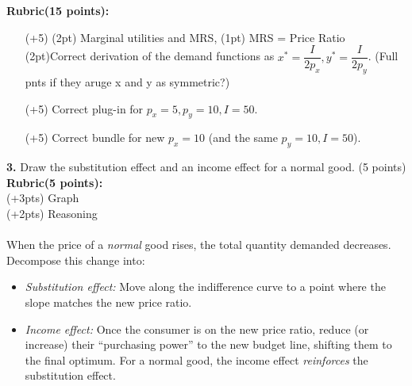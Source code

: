 \documentclass[12pt]{article}
\begin{document}
\vspace{1em}
\noindent
\textbf{Rubric(15 points):}
\begin{itemize}[noitemsep]
    \item[(+5)] (2pt) Marginal utilities and MRS, (1pt) MRS = Price Ratio (2pt)Correct derivation of the demand functions as $x^*=\dfrac{I}{2p_x}, y^*=\dfrac{I}{2p_y}$. (Full pnts if they aruge x and y as symmetric?) 
    \item[(+5)] Correct plug-in for $p_x=5, p_y=10, I=50$.
    \item[(+5)] Correct bundle for new $p_x=10$ (and the same $p_y=10, I=50$).
\end{itemize}

\noindent \textbf{3.} 
Draw the substitution effect and an income effect for a normal good. (5 points)\\
\textbf{Rubric(5 points):}\\
(+3pts) Graph\\
(+2pts) Reasoning\\\\
When the price of a \emph{normal} good rises, the total quantity demanded decreases. Decompose this change into:
    \begin{itemize}[noitemsep]
        \item \emph{Substitution effect:} Move along the indifference curve to a point where the slope matches the new price ratio.
        \item \emph{Income effect:} Once the consumer is on the new price ratio, reduce (or increase) their ``purchasing power'' to the new budget line, shifting them to the final optimum. For a normal good, the income effect \emph{reinforces} the substitution effect.
    \end{itemize}
\end{document}
